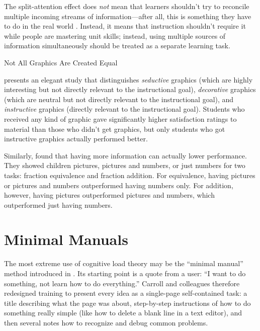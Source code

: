 The split-attention effect does \emph{not} mean that learners
shouldn't try to reconcile multiple incoming streams of
information---after all, this is something they have to do in the real
world \cite{Atki2000}.  Instead, it means that instruction shouldn't
require it while people are mastering unit skills; instead, using
multiple sources of information simultaneously should be treated as a
separate learning task.

\begin{callout}{Not All Graphics Are Created Equal}

  \cite{Sung2012} presents an elegant study that distinguishes
  \emph{seductive} graphics (which are highly interesting but not
  directly relevant to the instructional goal), \emph{decorative}
  graphics (which are neutral but not directly relevant to the
  instructional goal), and \emph{instructive} graphics (directly
  relevant to the instructional goal).  Students who received any kind
  of graphic gave significantly higher satisfaction ratings to
  material than those who didn't get graphics, but only students who
  got instructive graphics actually performed better.

  Similarly, \cite{Stam2013,Stam2014} found that having more
  information can actually lower performance.  They showed children
  pictures, pictures and numbers, or just numbers for two tasks:
  fraction equivalence and fraction addition.  For equivalence, having
  pictures or pictures and numbers outperformed having numbers only.
  For addition, however, having pictures outperformed pictures and
  numbers, which outperformed just having numbers.

\end{callout}

\section{Minimal Manuals}\label{s:load-minimal}

The most extreme use of cognitive load theory may be the ``minimal
manual'' method introduced in \cite{Carr1987}.  Its starting point
is a quote from a user: ``I want to do something, not learn how to do
everything.''  Carroll and colleagues therefore redesigned training to
present every idea as a single-page self-contained task: a title
describing what the page was about, step-by-step instructions of how
to do something really simple (like how to delete a blank line in a
text editor), and then several notes how to recognize and debug common
problems.

